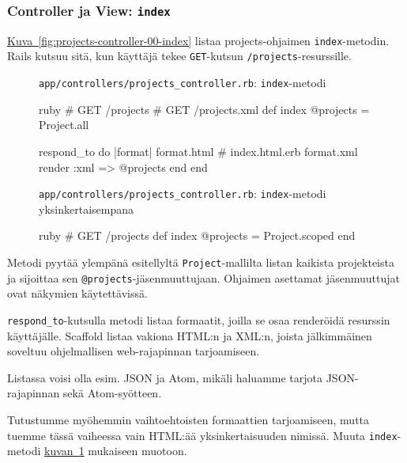 \documentclass{article}
\newenvironment{myfigure}[1][tbp]{
  \begin{figure}[#1]
    \centering
    \begin{lrbox}{\myfigurebox}
      \begin{minipage}{\textwidth}
}{
      \end{minipage}
    \end{lrbox}
    \colorbox{blue!4}{\usebox{\myfigurebox}}
  \end{figure}
}
\newcommand{\myref}[2]{\hyperref[#2]{#1~\ref*{#2}}}
\newcommand{\pdfforeignlanguage}[2]{\texorpdfstring{\foreignlanguage{#1}{#2}}{#2}}
\newcommand{\eng}[1]{\pdfforeignlanguage{english}{#1}}
\begin{document}
\subsubsection{\eng{Controller} ja \eng{View}: \texttt{index}}
\label{sec:projects-controller-00-index}

\begin{samepage}
\myref{Kuva}{fig:projects-controller-00-index} listaa projects-ohjaimen
\texttt{index}-metodin. Rails kutsuu sitä, kun käyttäjä tekee
\texttt{GET}-kutsun \texttt{/projects}-resurssille.

\begin{myfigure}[H]
\caption{\texttt{app/controllers/projects\_controller.rb}:
\texttt{index}-metodi}
\label{fig:projects-controller-00-index}

\begin{pygmented}{ruby}
  # GET /projects
  # GET /projects.xml
  def index
    @projects = Project.all

    respond_to do |format|
      format.html # index.html.erb
      format.xml  { render :xml => @projects }
    end
  end
\end{pygmented}

\caption{\texttt{app/controllers/projects\_controller.rb}:
\texttt{index}-metodi yksinkertaisempana}
\label{fig:projects-controller-01-index}

\begin{pygmented}{ruby}
  # GET /projects
  def index
    @projects = Project.scoped
  end
\end{pygmented}
\end{myfigure}
\end{samepage}

Metodi pyytää ylempänä esitellyltä \texttt{Project}-mallilta listan kaikista
projekteista ja sijoittaa sen \texttt{@projects}-jäsenmuuttujaan. Ohjaimen
asettamat jäsenmuuttujat ovat näkymien käytettävissä.

\texttt{respond\_to}-kutsulla metodi listaa formaatit, joilla se osaa
renderöidä resurssin käyttäjälle. \eng{Scaffold} listaa vakiona HTML:n ja
XML:n, joista jälkimmäinen soveltuu ohjelmallisen web-rajapinnan tarjoamiseen.

Listassa voisi olla esim. JSON ja Atom, mikäli haluamme tarjota JSON-rajapinnan
sekä Atom-syötteen.

Tutustumme myöhemmin vaihtoehtoisten formaattien tarjoamiseen, mutta tuemme
tässä vaiheessa vain HTML:ää yksinkertaisuuden nimissä. Muuta
\texttt{index}-metodi \myref{kuvan}{fig:projects-controller-01-index} mukaiseen
muotoon.
\end{document}
